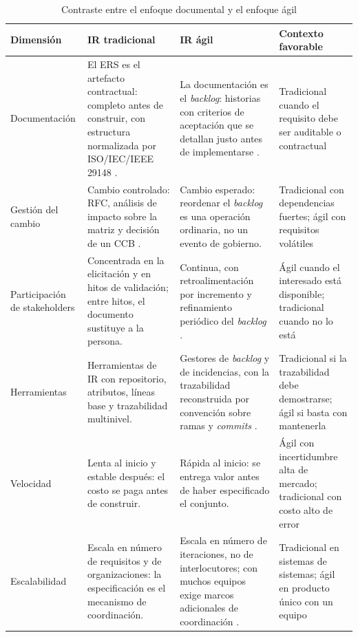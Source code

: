 \documentclass[11pt,letterpaper]{article}
\begin{document}
\begin{table}[H]
\centering\footnotesize
\caption{Contraste entre el enfoque documental y el enfoque ágil}
\begin{tabular}{L{2.6cm} L{4.7cm} L{4.7cm} L{2.3cm}}
\toprule
\textbf{Dimensión} & \textbf{IR tradicional} & \textbf{IR ágil} & \textbf{Contexto favorable}\\
\midrule
Documentación
& El ERS es el artefacto contractual: completo antes de construir, con estructura normalizada por ISO/IEC/IEEE 29148 \cite{iso29148}.
& La documentación es el \emph{backlog}: historias con criterios de aceptación que se detallan justo antes de implementarse \cite{cohn2004}.
& Tradicional cuando el requisito debe ser auditable o contractual\\
Gestión del cambio
& Cambio controlado: RFC, análisis de impacto sobre la matriz y decisión de un CCB \cite{pmbok7}.
& Cambio esperado: reordenar el \emph{backlog} es una operación ordinaria, no un evento de gobierno.
& Tradicional con dependencias fuertes; ágil con requisitos volátiles\\
Participación de stakeholders
& Concentrada en la elicitación y en hitos de validación; entre hitos, el documento sustituye a la persona.
& Continua, con retroalimentación por incremento y refinamiento periódico del \emph{backlog} \cite{ireb31}.
& Ágil cuando el interesado está disponible; tradicional cuando no lo está\\
Herramientas
& Herramientas de IR con repositorio, atributos, líneas base y trazabilidad multinivel.
& Gestores de \emph{backlog} y de incidencias, con la trazabilidad reconstruida por convención sobre ramas y \emph{commits} \cite{clelandhuang2012}.
& Tradicional si la trazabilidad debe demostrarse; ágil si basta con mantenerla\\
Velocidad
& Lenta al inicio y estable después: el costo se paga antes de construir.
& Rápida al inicio: se entrega valor antes de haber especificado el conjunto.
& Ágil con incertidumbre alta de mercado; tradicional con costo alto de error\\
Escalabilidad
& Escala en número de requisitos y de organizaciones: la especificación es el mecanismo de coordinación.
& Escala en número de iteraciones, no de interlocutores; con muchos equipos exige marcos adicionales de coordinación \cite{swebok4}.
& Tradicional en sistemas de sistemas; ágil en producto único con un equipo\\
\bottomrule
\end{tabular}
\end{table}
\end{document}
